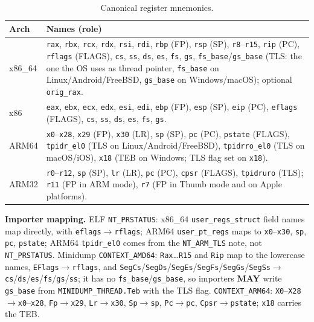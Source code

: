 \documentclass[11pt,a4paper]{article}
\newcommand{\MAY}{\textbf{MAY}}
\begin{document}
\begin{table}[H]\centering\caption{Canonical register mnemonics.}\label{tab:regnames}\small
\begin{tabularx}{\textwidth}{l X}\toprule\textbf{Arch}&\textbf{Names (role)}\\\midrule
x86\_64 & \texttt{rax}, \texttt{rbx}, \texttt{rcx}, \texttt{rdx}, \texttt{rsi}, \texttt{rdi}, \texttt{rbp} (FP), \texttt{rsp} (SP), \texttt{r8}--\texttt{r15}, \texttt{rip} (PC), \texttt{rflags} (FLAGS), \texttt{cs}, \texttt{ss}, \texttt{ds}, \texttt{es}, \texttt{fs}, \texttt{gs}, \texttt{fs\_base}/\texttt{gs\_base} (TLS: the one the OS uses as thread pointer, \texttt{fs\_base} on Linux/Android/FreeBSD, \texttt{gs\_base} on Windows/macOS); optional \texttt{orig\_rax}. \\
x86 & \texttt{eax}, \texttt{ebx}, \texttt{ecx}, \texttt{edx}, \texttt{esi}, \texttt{edi}, \texttt{ebp} (FP), \texttt{esp} (SP), \texttt{eip} (PC), \texttt{eflags} (FLAGS), \texttt{cs}, \texttt{ss}, \texttt{ds}, \texttt{es}, \texttt{fs}, \texttt{gs}. \\
ARM64 & \texttt{x0}--\texttt{x28}, \texttt{x29} (FP), \texttt{x30} (LR), \texttt{sp} (SP), \texttt{pc} (PC), \texttt{pstate} (FLAGS), \texttt{tpidr\_el0} (TLS on Linux/Android/FreeBSD), \texttt{tpidrro\_el0} (TLS on macOS/iOS), \texttt{x18} (TEB on Windows; TLS flag set on \texttt{x18}). \\
ARM32 & \texttt{r0}--\texttt{r12}, \texttt{sp} (SP), \texttt{lr} (LR), \texttt{pc} (PC), \texttt{cpsr} (FLAGS), \texttt{tpidruro} (TLS); \texttt{r11} (FP in ARM mode), \texttt{r7} (FP in Thumb mode and on Apple platforms). \\\bottomrule
\end{tabularx}\end{table}

\noindent\textbf{Importer mapping.} ELF \texttt{NT\_PRSTATUS}: x86\_64 \texttt{user\_regs\_struct} field names map directly, with \texttt{eflags}$\to$\texttt{rflags}; ARM64 \texttt{user\_pt\_regs} maps to \texttt{x0}--\texttt{x30}, \texttt{sp}, \texttt{pc}, \texttt{pstate}; ARM64 \texttt{tpidr\_el0} comes from the \texttt{NT\_ARM\_TLS} note, not \texttt{NT\_PRSTATUS}. Minidump \texttt{CONTEXT\_AMD64}: \texttt{Rax}\ldots\texttt{R15} and \texttt{Rip} map to the lowercase names, \texttt{EFlags}$\to$\texttt{rflags}, and \texttt{SegCs}/\allowbreak\texttt{SegDs}/\allowbreak\texttt{SegEs}/\allowbreak\texttt{SegFs}/\allowbreak\texttt{SegGs}/\allowbreak\texttt{SegSs}$\to$\allowbreak\texttt{cs}/\allowbreak\texttt{ds}/\allowbreak\texttt{es}/\allowbreak\texttt{fs}/\allowbreak\texttt{gs}/\allowbreak\texttt{ss}; it has no \texttt{fs\_base}/\allowbreak\texttt{gs\_base}, so importers \MAY{} write \texttt{gs\_base} from \texttt{MINIDUMP\_THREAD.Teb} with the TLS flag. \texttt{CONTEXT\_ARM64}: \texttt{X0}--\texttt{X28}$\to$\texttt{x0}--\texttt{x28}, \texttt{Fp}$\to$\texttt{x29}, \texttt{Lr}$\to$\texttt{x30}, \texttt{Sp}$\to$\texttt{sp}, \texttt{Pc}$\to$\texttt{pc}, \texttt{Cpsr}$\to$\texttt{pstate}; \texttt{x18} carries the TEB.
\end{document}
